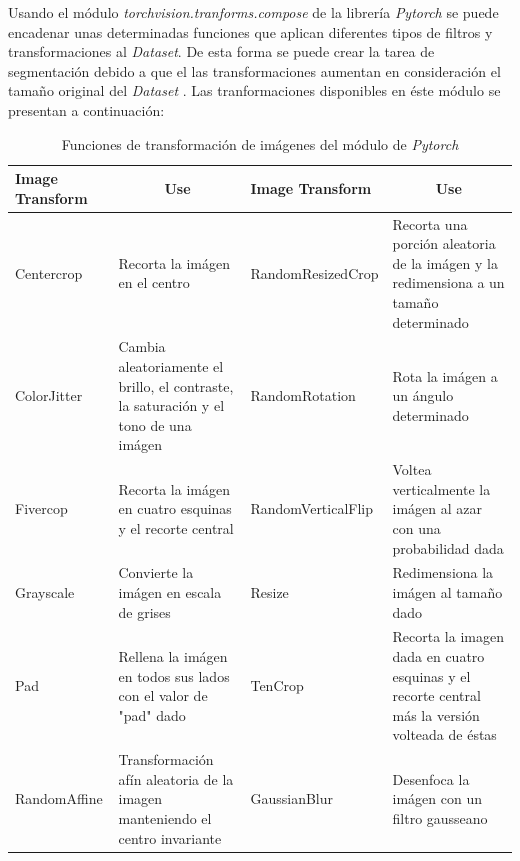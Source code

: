 			Usando el módulo \textit{torchvision.tranforms.compose} de la librería \textit{Pytorch} se puede encadenar unas determinadas funciones que aplican diferentes tipos de filtros y transformaciones al \textit{Dataset}. De esta forma se puede crear la tarea de segmentación debido a que el las transformaciones aumentan en consideración el tamaño original del \textit{Dataset} \cite{Pytorch}. Las tranformaciones disponibles en éste módulo se presentan a continuación:
			
			\begin{table}[ht]
				\centering
				\begin{tabular}{|p{4cm}|p{4cm}|p{4cm}|p{4cm}|}
					\hline
					Image Transform       & \multicolumn{1}{c|}{Use}                                                               & Image Transform       & \multicolumn{1}{c|}{Use}                                                                        \\ \hline
					Centercrop            & Recorta la imágen en el centro                                                         & RandomResizedCrop     & Recorta una porción aleatoria de la imágen y la redimensiona a un tamaño determinado            \\ \hline
					ColorJitter           & Cambia aleatoriamente el brillo, el contraste, la saturación y el tono de una imágen   & RandomRotation        & Rota la imágen a un ángulo determinado                                                          \\ \hline
					Fivercop              & Recorta la imágen en cuatro esquinas y el recorte central                              & RandomVerticalFlip    & Voltea verticalmente la imágen al azar con una probabilidad dada                                \\ \hline
					Grayscale             & Convierte la imágen en escala de grises                                                & Resize                & Redimensiona la imágen al tamaño dado                                                           \\ \hline
					Pad                   & Rellena la imágen en todos sus lados con el valor de "pad" dado                        & TenCrop               & Recorta la imagen dada en cuatro esquinas y el recorte central más la versión volteada de éstas \\ \hline
					RandomAffine          & Transformación afín aleatoria de la imagen manteniendo el centro invariante            & GaussianBlur          & Desenfoca la imágen con un filtro gausseano                                                                                                                                                     \\ \hline
				\end{tabular}
				\caption{Funciones de transformación de imágenes del módulo de \textit{Pytorch}}
			\end{table}
			
